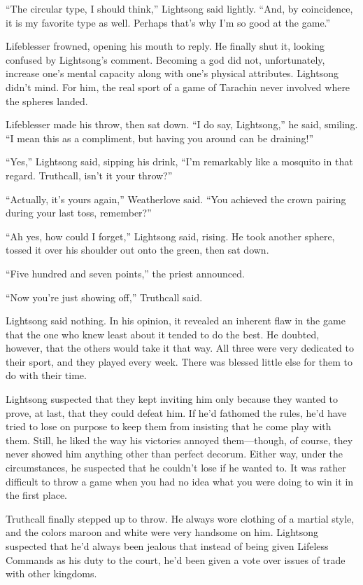 “The circular type, I should think,” Lightsong said lightly. “And, by coincidence, it is my favorite type as well. Perhaps that’s why I’m so good at the game.”

Lifeblesser frowned, opening his mouth to reply. He finally shut it, looking confused by Lightsong’s comment. Becoming a god did not, unfortunately, increase one’s mental capacity along with one’s physical attributes. Lightsong didn’t mind. For him, the real sport of a game of Tarachin never involved where the spheres landed.

Lifeblesser made his throw, then sat down. “I do say, Lightsong,” he said, smiling. “I mean this as a compliment, but having you around can be draining!”

“Yes,” Lightsong said, sipping his drink, “I’m remarkably like a mosquito in that regard. Truthcall, isn’t it your throw?”

“Actually, it’s yours again,” Weatherlove said. “You achieved the crown pairing during your last toss, remember?”

“Ah yes, how could I forget,” Lightsong said, rising. He took another sphere, tossed it over his shoulder out onto the green, then sat down.

“Five hundred and seven points,” the priest announced.

“Now you’re just showing off,” Truthcall said.

Lightsong said nothing. In his opinion, it revealed an inherent flaw in the game that the one who knew least about it tended to do the best. He doubted, however, that the others would take it that way. All three were very dedicated to their sport, and they played every week. There was blessed little else for them to do with their time.

Lightsong suspected that they kept inviting him only because they wanted to prove, at last, that they could defeat him. If he’d fathomed the rules, he’d have tried to lose on purpose to keep them from insisting that he come play with them. Still, he liked the way his victories annoyed them—though, of course, they never showed him anything other than perfect decorum. Either way, under the circumstances, he suspected that he couldn’t lose if he wanted to. It was rather difficult to throw a game when you had no idea what you were doing to win it in the first place.

Truthcall finally stepped up to throw. He always wore clothing of a martial style, and the colors maroon and white were very handsome on him. Lightsong suspected that he’d always been jealous that instead of being given Lifeless Commands as his duty to the court, he’d been given a vote over issues of trade with other kingdoms.

